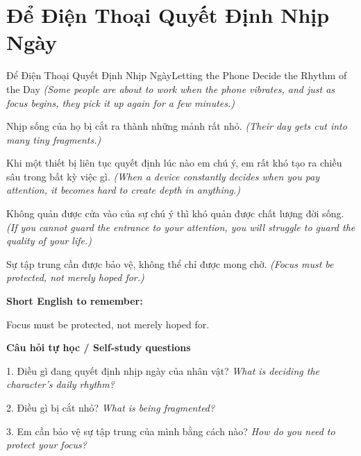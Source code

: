 \section{Để Điện Thoại Quyết Định Nhịp Ngày}
\begin{truyen}{Để Điện Thoại Quyết Định Nhịp Ngày}{Letting the Phone Decide the Rhythm of the Day}
\textit{(Some people are about to work when the phone vibrates, and just as focus begins, they pick it up again for a few minutes.)}

Nhịp sống của họ bị cắt ra thành những mảnh rất nhỏ.
\textit{(Their day gets cut into many tiny fragments.)}

Khi một thiết bị liên tục quyết định lúc nào em chú ý, em rất khó tạo ra chiều sâu trong bất kỳ việc gì.
\textit{(When a device constantly decides when you pay attention, it becomes hard to create depth in anything.)}

Không quản được cửa vào của sự chú ý thì khó quản được chất lượng đời sống.
\textit{(If you cannot guard the entrance to your attention, you will struggle to guard the quality of your life.)}

\end{truyen}

\begin{baihoc}
Sự tập trung cần được bảo vệ, không thể chỉ được mong chờ.
\textit{(Focus must be protected, not merely hoped for.)}
\end{baihoc}

\begin{ghinhoanh}
\textbf{Short English to remember:}

Focus must be protected, not merely hoped for.

\end{ghinhoanh}

\begin{tuhocnhanh}
\textbf{Câu hỏi tự học / Self-study questions}

1. Điều gì đang quyết định nhịp ngày của nhân vật? \textit{What is deciding the character's daily rhythm?}

2. Điều gì bị cắt nhỏ? \textit{What is being fragmented?}

3. Em cần bảo vệ sự tập trung của mình bằng cách nào? \textit{How do you need to protect your focus?}
\end{tuhocnhanh}
\ngancach

